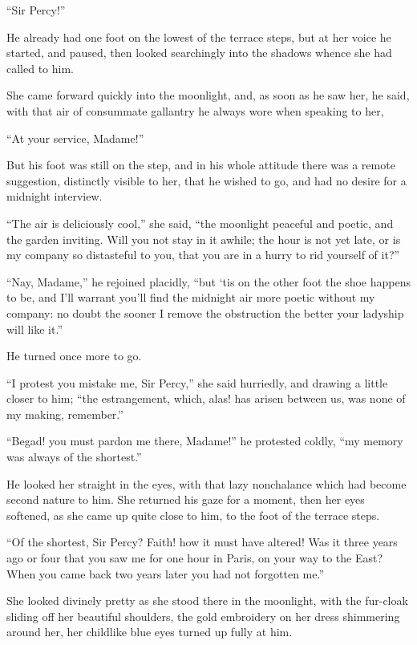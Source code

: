 \enquote{Sir Percy!}

He already had one foot on the lowest of the terrace steps, but at her voice he started, and paused, then looked searchingly into the shadows whence she had called to him.

She came forward quickly into the moonlight, and, as soon as he saw her, he said, with that air of consummate gallantry he always wore when speaking to her,\longdash


\enquote{At your service, Madame!}

But his foot was still on the step, and in his whole attitude there was a remote suggestion, distinctly visible to her, that he wished to go, and had no desire for a midnight interview.

\enquote{The air is deliciously cool,} she said, \enquote{the moonlight peaceful and poetic, and the garden inviting. Will you not stay in it awhile; the hour is not yet late, or is my company so distasteful to you, that you are in a hurry to rid yourself of it?}

\enquote{Nay, Madame,} he rejoined placidly, \enquote{but `tis on the other foot the shoe happens to be, and I'll warrant you'll find the midnight air more poetic without my company: no doubt the sooner I remove the obstruction the better your ladyship will like it.}

He turned once more to go.

\enquote{I protest you mistake me, Sir Percy,} she said hurriedly, and drawing a little closer to him; \enquote{the estrangement, which, alas! has arisen between us, was none of my making, remember.}

\enquote{Begad! you must pardon me there, Madame!} he protested coldly, \enquote{my memory was always of the shortest.}

He looked her straight in the eyes, with that lazy nonchalance which had become second nature to him. She returned his gaze for a moment, then her eyes softened, as she came up quite close to him, to the foot of the terrace steps.

\enquote{Of the shortest, Sir Percy? Faith! how it must have altered! Was it three years ago or four that you saw me for one hour in Paris, on your way to the East? When you came back two years later you had not forgotten me.}

She looked divinely pretty as she stood there in the moonlight, with the fur-cloak sliding off her beautiful shoulders, the gold embroidery on her dress shimmering around her, her childlike blue eyes turned up fully at him.

